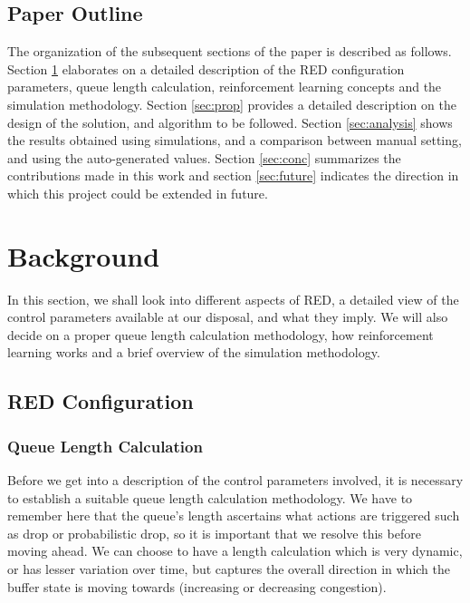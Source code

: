 \documentclass[conference, 10pt]{IEEEtran}
\begin{document}
\subsection{Paper Outline}
\label{sec:intro:outline}
The organization of the subsequent sections of the paper is described as follows. Section \ref{sec:back} elaborates on a detailed description of the RED configuration parameters, queue length calculation, reinforcement learning concepts and the simulation methodology. Section \ref{sec:prop} provides a detailed description on the design of the solution, and algorithm to be followed. Section \ref{sec:analysis} shows the results obtained using simulations, and a comparison between manual setting, and using the auto-generated values. Section \ref{sec:conc} summarizes the contributions made in this work and section \ref{sec:future} indicates the direction in which this project could be extended in future. 
 

\section{Background}
\label{sec:back}
In this section, we shall look into different aspects of RED, a detailed view of the control parameters available at our disposal, and what they imply. We will also decide on a proper queue length calculation methodology, how reinforcement learning works and a brief overview of the simulation methodology. 
\subsection{RED Configuration}
\label{sec:back:ngacpm}

\subsubsection{Queue Length Calculation}
\label{sec:back:ngacpm:elements}
Before we get into a description of the control parameters involved, it is necessary to establish a suitable queue length calculation methodology. We have to remember here that the queue's length ascertains what actions are triggered such as drop or probabilistic drop, so it is important that we resolve this before moving ahead. We can choose to have a length calculation which is very dynamic, or has lesser variation over time, but captures the overall direction in which the buffer state is moving towards (increasing or decreasing congestion).
\end{document}
